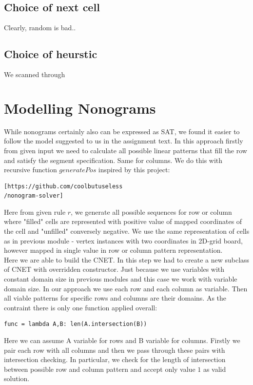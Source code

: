 \documentclass[journal]{IEEEtran}
\begin{document}
\subsection{Choice of next cell}
Clearly, random is bad..

\subsection{Choice of heurstic}
We scanned through 


\section*{Modelling Nonograms}
While nonograms certainly also can be expressed as SAT, we found it easier to
follow the model suggested to us in the assignment text. In this approach firstly from given input 
we need to calculate all possible linear patterns that fill the row and satisfy the segment specification. 
Same for columns. We do this with recursive function $generatePos$ inspired by this project:
\small\begin{verbatim}
[https://github.com/coolbutuseless
/nonogram-solver]
\end{verbatim}
\normalsize
Here from given rule $r$, we generate all possible sequences for row or column where "filled" 
cells are represented with positive value of mapped coordinates of the cell and "unfilled" conversely negative. 
We use the same representation of cells as in previous module - vertex instances with two coordinates 
in 2D-grid board, however mapped in single value in row or column pattern representation.\\

Here we are able to build the CNET. In this step we had to create a new subclass of CNET with 
overridden constructor. Just because we use variables with constant domain size in previous modules 
and this case we work with variable domain size.
In our approach we use each row and each column as variable. Then all viable patterns for specific rows 
and columns are their domains.
As the contraint there is only one function applied overall:
\begin{verbatim}
func = lambda A,B: len(A.intersection(B))
\end{verbatim}
Here we can assume A variable for rows and B variable for columns. Firstly we pair each row with all columns 
and then we pass through these pairs with intersection checking. In particular, we check for the length of intersection 
between possible row and column pattern and accept only value $1$ as valid solution. %
\end{document}

